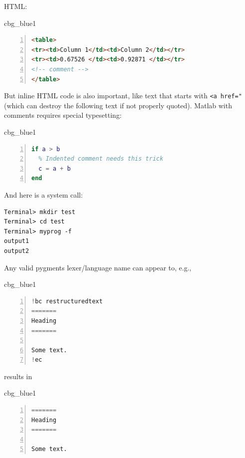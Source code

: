 \documentclass[%
oneside,                 %
final,                   %
10pt]{article}
\newenvironment{_cod_tight}[1]{
   \def\FrameCommand{\colorbox{#1}}
   \FrameRule0.6pt\MakeFramed {\FrameRestore}\vskip3mm}
   {\vskip0mm\endMakeFramed}
\newenvironment{cod}[1]{
\bgroup\rmfamily
\fboxsep=0mm\relax
\begin{_cod_tight}{#1}
\list{}{\parsep=-2mm\parskip=0mm\topsep=0pt\leftmargin=2mm
\rightmargin=2\leftmargin\leftmargin=4pt\relax}
\item\relax}
{\endlist\end{_cod_tight}\egroup}
\theoremstyle{definition}
\begin{document}
HTML:
\begin{cod}{cbg_blue1}\begin{lstlisting}[language=HTML,style=myspeciallststyle,numbers=left,numberstyle=\tiny,stepnumber=3,numbersep=15pt,xleftmargin=1mm]
<table>
<tr><td>Column 1</td><td>Column 2</td></tr>
<tr><td>0.67526 </td><td>0.92871 </td></tr>
<!-- comment -->
</table>

\end{lstlisting}\end{cod}
\noindent

But inline HTML code is also important, like text that starts with
\texttt{<a href="} (which can destroy the following text if not properly
quoted).
Matlab with comments requires special typesetting:
\begin{cod}{cbg_blue1}\begin{lstlisting}[language=Matlab,style=myspeciallststyle,numbers=left,numberstyle=\tiny,stepnumber=3,numbersep=15pt,xleftmargin=1mm]
% Comment on the beginning of the line can be escaped by %%
if a > b
  % Indented comment needs this trick
  c = a + b
end

\end{lstlisting}\end{cod}
\noindent

And here is a system call:
\begin{Verbatim}[frame=lines,label=\fbox{{\tiny Terminal}},framesep=2.5mm,framerule=0.7pt]
Terminal> mkdir test
Terminal> cd test
Terminal> myprog -f
output1
output2

\end{Verbatim}

Any valid pygments lexer/language name can appear to, e.g.,
\begin{cod}{cbg_blue1}\begin{lstlisting}[language=Python,style=myspeciallststyle,numbers=left,numberstyle=\tiny,stepnumber=3,numbersep=15pt,xleftmargin=1mm]
!bc restructuredtext
=======
Heading
=======

Some text.
!ec

\end{lstlisting}\end{cod}
\noindent

results in
\begin{cod}{cbg_blue1}\begin{lstlisting}[language=Python,style=myspeciallststyle,numbers=left,numberstyle=\tiny,stepnumber=3,numbersep=15pt,xleftmargin=1mm]
=======
Heading
=======

Some text.

\end{lstlisting}\end{cod}
\noindent
\end{document}
